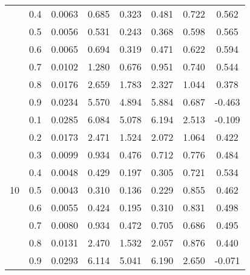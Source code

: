 \documentclass[11pt,a4paper]{report}
\begin{document}
\begin{longtable}{ | c | c || c | c | c | c | c | c | }
 & 0.4 & 0.0063 & 0.685 & 0.323 & 0.481 & 0.722 & 0.562 \\
 & 0.5 & 0.0056 & 0.531 & 0.243 & 0.368 & 0.598 & 0.565 \\
 & 0.6 & 0.0065 & 0.694 & 0.319 & 0.471 & 0.622 & 0.594 \\
 & 0.7 & 0.0102 & 1.280 & 0.676 & 0.951 & 0.740 & 0.544 \\
 & 0.8 & 0.0176 & 2.659 & 1.783 & 2.327 & 1.044 & 0.378 \\
 & 0.9 & 0.0234 & 5.570 & 4.894 & 5.884 & 0.687 & -0.463 \\
 \hline
\multirow{9}{*}{10} & 0.1 & 0.0285 & 6.084 & 5.078 & 6.194 & 2.513 & -0.109 \\
 & 0.2 & 0.0173 & 2.471 & 1.524 & 2.072 & 1.064 & 0.422 \\
 & 0.3 & 0.0099 & 0.934 & 0.476 & 0.712 & 0.776 & 0.484 \\
 & 0.4 & 0.0048 & 0.429 & 0.197 & 0.305 & 0.721 & 0.534 \\
 & 0.5 & 0.0043 & 0.310 & 0.136 & 0.229 & 0.855 & 0.462 \\
 & 0.6 & 0.0055 & 0.424 & 0.195 & 0.310 & 0.831 & 0.498 \\
 & 0.7 & 0.0080 & 0.934 & 0.472 & 0.705 & 0.686 & 0.495 \\
 & 0.8 & 0.0131 & 2.470 & 1.532 & 2.057 & 0.876 & 0.440 \\
 & 0.9 & 0.0293 & 6.114 & 5.041 & 6.190 & 2.650 & -0.071 \\
 \hline
\hline
\end{longtable}
\end{document}
